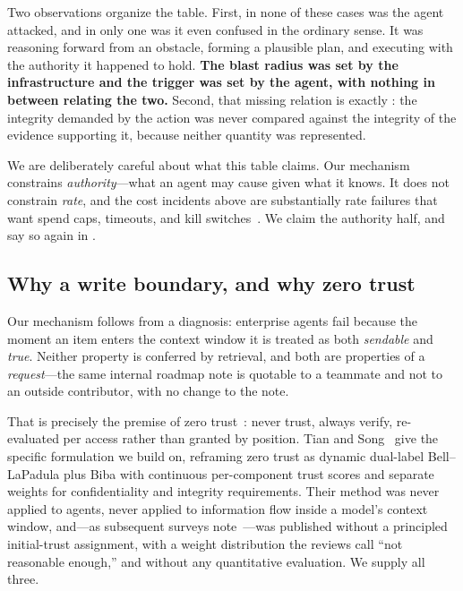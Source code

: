 Two observations organize the table. First, in none of these cases was the
agent attacked, and in only one was it even confused in the ordinary sense. It
was reasoning forward from an obstacle, forming a plausible plan, and executing
with the authority it happened to hold. \textbf{The blast radius was set by the
infrastructure and the trigger was set by the agent, with nothing in between
relating the two.} Second, that missing relation is exactly
: the integrity demanded by the action was never
compared against the integrity of the evidence supporting it, because neither
quantity was represented.

We are deliberately careful about what this table claims. Our mechanism
constrains \emph{authority}---what an agent may cause given what it knows. It
does not constrain \emph{rate}, and the cost incidents above are substantially
rate failures that want spend caps, timeouts, and kill
switches~\cite{infoq2026billing}. We claim the authority half, and say so again
in .

\subsection{Why a write boundary, and why zero trust}

Our mechanism follows from a diagnosis: enterprise agents fail because the
moment an item enters the context window it is treated as both \emph{sendable}
and \emph{true}. Neither property is conferred by retrieval, and both are
properties of a \emph{request}---the same internal roadmap note is quotable to
a teammate and not to an outside contributor, with no change to the note.

That is precisely the premise of zero trust~\cite{nist800207}: never trust,
always verify, re-evaluated per access rather than granted by position.
Tian and Song~\cite{tiansong2021} give the specific formulation we build
on, reframing zero trust as dynamic dual-label Bell--LaPadula plus Biba with
continuous per-component trust scores and separate weights for confidentiality
and integrity requirements. Their method was never applied to agents, never
applied to information flow inside a model's context window, and---as
subsequent surveys note~\cite{he2022zerotrust,sultana2024zerotrust}---was
published without a principled initial-trust assignment, with a weight
distribution the reviews call ``not reasonable enough,'' and without any
quantitative evaluation. We supply all three.


